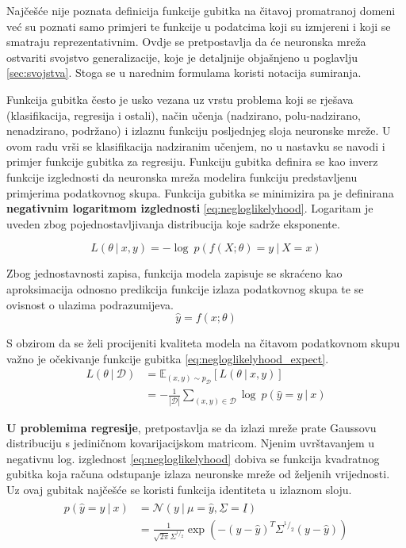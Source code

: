 \documentclass[times, utf8, numeric, diplomski]{fer}
\def\mat#1{\underline{#1}}
\def\expect{\mathbb{E}}
\def\normal{\mathcal{N}}
\def\probsep{\ |\ }
\def\dataset{\mathcal{D}}
\begin{document}
Najčešće nije poznata definicija funkcije gubitka na čitavoj promatranoj domeni već su poznati samo primjeri te funkcije u podatcima koji su izmjereni i koji se smatraju reprezentativnim. Ovdje se pretpostavlja da će neuronska mreža ostvariti svojstvo generalizacije, koje je detaljnije objašnjeno u poglavlju \ref{sec:svojstva}. Stoga se u narednim formulama koristi notacija sumiranja.

Funkcija gubitka često je usko vezana uz vrstu problema koji se rješava (klasifikacija, regresija i ostali), način učenja (nadzirano, polu-nadzirano, nenadzirano, podržano) i izlaznu funkciju posljednjeg sloja neuronske mreže. U ovom radu vrši se klasifikacija nadziranim učenjem, no u nastavku se navodi i primjer funkcije gubitka za regresiju. Funkciju gubitka definira se kao inverz funkcije izglednosti da neuronska mreža modelira funkciju predstavljenu primjerima podatkovnog skupa. Funkcija gubitka se minimizira pa je definirana \textbf{negativnim logaritmom izglednosti} \eqref{eq:negloglikelyhood}. Logaritam je uveden zbog pojednostavljivanja distribucija koje sadrže eksponente.

\begin{equation}
\label{eq:negloglikelyhood}
L(\theta \probsep x,y) = -\log\ p(f(X;\theta)=y \probsep X=x)
\end{equation}

Zbog jednostavnosti zapisa, funkcija modela zapisuje se skraćeno kao aproksimacija odnosno predikcija funkcije izlaza podatkovnog skupa te se ovisnost o ulazima podrazumijeva.
\begin{equation}
\hat{y} = f(x; \theta)
\end{equation}

S obzirom da se želi procijeniti kvaliteta modela na čitavom podatkovnom skupu važno je očekivanje funkcije gubitka \eqref{eq:negloglikelyhood_expect}.
\begin{equation}
\label{eq:negloglikelyhood_expect}
\begin{split}
L(\theta \probsep \dataset) &= \expect_{(x,y) \sim p_\dataset}[L(\theta \probsep x,y)] \\
&= -\frac{1}{|\dataset|} \sum_{(x,y)\in\dataset} \log\ p(\hat{y}=y \probsep x)
\end{split}
\end{equation}

\textbf{U problemima regresije}, pretpostavlja se da izlazi mreže prate Gaussovu distribuciju s jediničnom kovarijacijskom matricom. Njenim uvrštavanjem u negativnu log. izglednost \eqref{eq:negloglikelyhood} dobiva se funkcija kvadratnog gubitka koja računa odstupanje izlaza neuronske mreže od željenih vrijednosti. Uz ovaj gubitak najčešće se koristi funkcija identiteta u izlaznom sloju.
\begin{align}
\label{eq:normal_dist}
\begin{split}
p(\hat{y}=y \probsep x) &= \normal(y \probsep \mu=\hat{y}, \mat{\Sigma}=\mat{I}) \\
&= \frac{1}{\sqrt{2\pi}\Sigma^{^1/_2}} \exp(-(y-\hat{y})^T\Sigma^{^1/_2}(y-\hat{y}))
\end{split}
\end{align}
\end{document}
